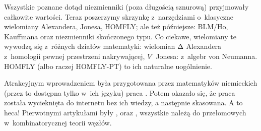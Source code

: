 
Wszystkie poznane dotąd niezmienniki (poza długością sznurową) przyjmowały całkowite wartości.
Teraz poszerzymy skrzynkę z~narzędziami o~klasyczne wielomiany Alexandera, Jonesa, HOMFLY; ale też późniejsze: BLM/Ho, Kauffmana oraz niezmienniki skończonego typu.
Co ciekawe, wielomiany te wywodzą się z~różnych działów matematyki: wielomian $\Delta$ Alexandera z~homologii pewnej przestrzeni nakrywającej, $V$ Jonesa: z~algebr von Neumanna.
HOMFLY (albo raczej HOMFLY-PT) to ich naturalne uogólnienie.

Atrakcyjnym wprowadzeniem była przygotowana przez matematyków niemieckich (przez to dostępna tylko w~ich języku) praca \cite{gellert2009}.
Potem okazało się, że praca została wycieknięta do internetu bez ich wiedzy, a następnie skasowana.
A to heca!
Pierwotnymi artykułami były \cite{alexander1928}, \cite{jones1985} oraz \cite{homfly1985}, wszystkie należą do przełomowych w~kombinatorycznej teorii węzłów.

